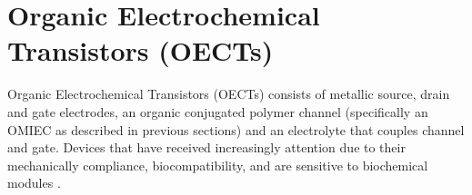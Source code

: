 {\section{Organic Electrochemical Transistors (OECTs)}}
\label{sec:OECTs}

Organic Electrochemical Transistors (OECTs) consists of metallic source, drain and gate electrodes, an organic conjugated polymer channel (specifically an OMIEC as described in previous sections) and an electrolyte that couples channel and gate. Devices that have received increasingly attention due to their mechanically compliance, biocompatibility, and are sensitive to biochemical modules \cite{tanMixedIonicElectronic2022}. 

\begin{figure}[ht]
	\centering
	\qquad

\end{figure}
